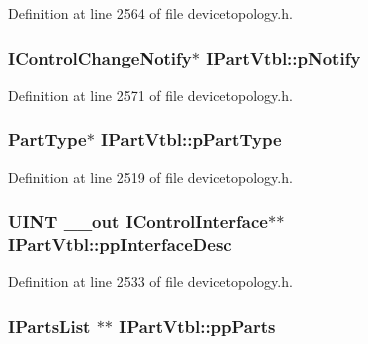 Definition at line 2564 of file devicetopology.\+h.

\subsubsection[{\texorpdfstring{p\+Notify}{pNotify}}]{ {\bf I\+Control\+Change\+Notify}$\ast$ I\+Part\+Vtbl\+::p\+Notify}\hypertarget{struct_i_part_vtbl_ab50a1577d286f6888e0e157855487a6d}{}\label{struct_i_part_vtbl_ab50a1577d286f6888e0e157855487a6d}


Definition at line 2571 of file devicetopology.\+h.

\subsubsection[{\texorpdfstring{p\+Part\+Type}{pPartType}}]{ {\bf Part\+Type}$\ast$ I\+Part\+Vtbl\+::p\+Part\+Type}\hypertarget{struct_i_part_vtbl_ac27e43b65edc50005aca2fe65616dfc0}{}\label{struct_i_part_vtbl_ac27e43b65edc50005aca2fe65616dfc0}


Definition at line 2519 of file devicetopology.\+h.

\subsubsection[{\texorpdfstring{pp\+Interface\+Desc}{ppInterfaceDesc}}]{ {\bf U\+I\+NT} {\bf \+\_\+\+\_\+out} {\bf I\+Control\+Interface}$\ast$$\ast$ I\+Part\+Vtbl\+::pp\+Interface\+Desc}\hypertarget{struct_i_part_vtbl_adf635426b958125630864e12c2e8a2f9}{}\label{struct_i_part_vtbl_adf635426b958125630864e12c2e8a2f9}


Definition at line 2533 of file devicetopology.\+h.

\subsubsection[{\texorpdfstring{pp\+Parts}{ppParts}}]{ {\bf I\+Parts\+List} $\ast$$\ast$ I\+Part\+Vtbl\+::pp\+Parts}\hypertarget{struct_i_part_vtbl_aa984468533ad22e13026a4810808148d}{}\label{struct_i_part_vtbl_aa984468533ad22e13026a4810808148d}


